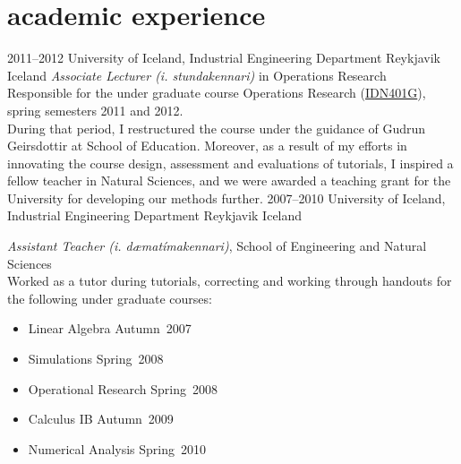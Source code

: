 \documentclass[]{cv} %
\begin{document}
\section{academic experience}
\begin{entrylist}
    \entry
    {2011--2012}
    {University of Iceland, Industrial Engineering Department}
    {Reykjavik Iceland}
    {\emph{Associate Lecturer (i. stundakennari)} in Operations Research \\
        Responsible for the under graduate course Operations Research 
        (\href{https://ugla.hi.is/kennsluskra/index.php?sid=&tab=nam&chapter=namskeid&id=08213020110}{IDN401G}),
         spring semesters 2011 and 2012. \\
        During that period, I restructured the course under the guidance of 
        Gudrun Geirsdottir at School of Education. Moreover, as a result of my 
        efforts in innovating the course design, assessment and evaluations of 
        tutorials, I inspired a fellow teacher in Natural Sciences, and we were 
        awarded a teaching grant for the University for developing our methods 
        further.
    }
    \entry
    {2007--2010}
    {University of Iceland, Industrial Engineering Department}
    {Reykjavik Iceland}
    {\emph{Assistant Teacher (i. dæmatímakennari)}, School of Engineering and 
    Natural Sciences \\
        Worked as a tutor during tutorials, correcting and working through 
        handouts for the following under graduate courses: 
        \begin{itemize}
            \item Linear Algebra 		\hfill Autumn~2007
            \item Simulations			\hfill Spring~2008
            \item Operational Research 	\hfill Spring~2008
            \item Calculus IB			\hfill Autumn~2009
            \item Numerical Analysis 	\hfill Spring~2010
        \end{itemize}	
    }
\end{entrylist}   
\end{document}
